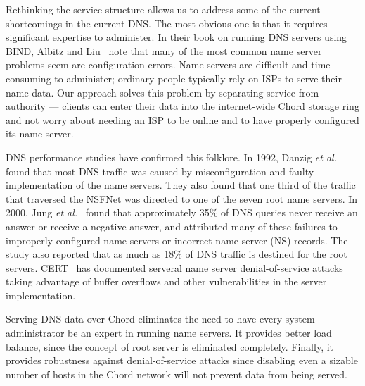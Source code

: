 Rethinking the service structure allows us to address
some of the current shortcomings in the current DNS.
The most obvious one is that it requires 
significant expertise to administer.
In their book on running DNS servers using BIND,
Albitz and Liu~\cite{dns-bind} note that many of the most
common name server problems seem are configuration errors.
Name servers are difficult and time-consuming to administer;
ordinary people typically rely on ISPs to serve their name data.
Our approach solves this problem by separating service from
authority --- clients can enter their data into the internet-wide
Chord storage ring and not worry about needing an ISP to be
online and to have properly configured its name server.

DNS performance studies have confirmed this folklore.
In 1992, Danzig {\it et al.}~\cite{dnsroot:sigcomm92} found that
most DNS traffic was caused by misconfiguration and faulty implementation
of the name servers.
They also found that one third of the 
traffic that traversed the NSFNet was directed to one of 
the seven root name servers. 
In 2000, Jung {\it et al.}~\cite{dnscache:sigcommimw01}
found that approximately 35\% of DNS queries never receive
an answer or receive a negative answer, and attributed
many of these failures to 
improperly configured name servers or incorrect name server (NS) records.
The study also reported that as much as 18\% of DNS traffic is destined
for the root servers. 
CERT~\cite{cert} has documented serveral name server
denial-of-service attacks taking advantage of buffer overflows
and other vulnerabilities in the server implementation.

Serving DNS data over Chord eliminates the need to have
every system administrator be an expert in running name servers.
It provides better load balance, since the concept of root server
is eliminated completely.
Finally, it provides robustness against denial-of-service attacks
since disabling even a sizable number of hosts in the 
Chord network will not prevent data from being served.
